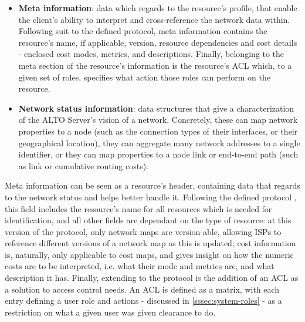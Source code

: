 \begin{itemize}
        \item \textbf{Meta information}: data which regards to the resource's profile, that enable the client's ability to interpret and cross-reference the network data within.
            Following suit to the defined protocol, meta information contains the resource's name, if applicable, version, resource dependencies and cost details - enclosed cost modes, metrics, and descriptions.
            Finally, belonging to the meta section of the resource's information is the resource's ACL which, to a given set of roles, specifies what action those roles can perform on the resource.

        \item \textbf{Network status information}: data structures that give a characterization of the ALTO Server's vision of a network. Concretely, these can map network properties to a node (such as the connection types of their interfaces, or their geographical location), they can aggregate many network addresses to a single identifier, or they can map properties to a node link or end-to-end path (such as link or cumulative routing costs).
\end{itemize}{}

    Meta information can be seen as a resource's header, containing data that regards to the network status and helps better handle it.
    Following the defined protocol \cite{alto-protocol}, this field includes the resource's name for all resources which is needed for identification, and all other fields are dependant on the type of resource: at this version of the protocol, only network maps are version-able, allowing ISPs to reference different versions of a network map as this is updated; cost information is, naturally, only applicable to cost maps, and gives insight on how the numeric costs are to be interpreted, i.e. what their mode and metrics are, and what description it has.
    Finally, extending to the protocol is the addition of an ACL as a solution to access control needs.
    An ACL is defined as a matrix, with each entry defining a user role and actions - discussed in \ref{sssec:system-roles} - as a restriction on what a given user was given clearance to do.

